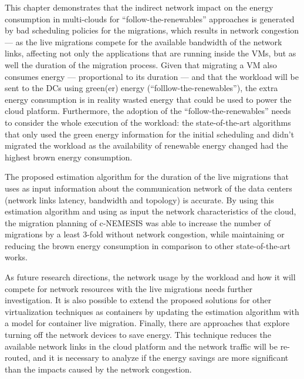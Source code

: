 This chapter demonstrates that the indirect network impact on the energy consumption in multi-clouds for ``follow-the-renewables'' approaches is generated by bad scheduling policies for the migrations, which results in network congestion --- as the live migrations compete for the available bandwidth of the network links, affecting not only the applications that are running inside the VMs, but as well the duration of the migration process. Given that migrating a VM also consumes energy --- proportional to its duration --- and that the workload will be sent to the DCs using green(er) energy (``folllow-the-renewables''), the extra energy consumption is in reality wasted energy that could be used to power the cloud platform. Furthermore, the adoption of the ``follow-the-renewables'' needs to consider the whole execution of the workload:  the state-of-the-art algorithms that only used the green energy information for the initial scheduling and didn't migrated the workload as the availability of renewable energy changed had the highest brown energy consumption. 

The proposed estimation algorithm for the duration of the live migrations that uses as input information about the communication network of the data centers (network links latency, bandwidth and topology) is accurate. By using this estimation algorithm and using as input the network characteristics of the cloud, the migration planning of c-NEMESIS was able to increase the number of migrations by a least 3-fold without network congestion, while maintaining or reducing the brown energy consumption in comparison to other state-of-the-art works.

As future research directions, the network usage by the workload and how it will compete for network resources with the live migrations needs further investigation. It is also possible to extend the proposed solutions for other virtualization techniques as containers by updating the estimation algorithm with a model for container live migration. Finally, there are approaches that explore turning off the network devices to save energy. This technique reduces the available network links in the cloud platform and the network traffic will be re-routed, and it is necessary to analyze if the energy savings are more significant than the impacts caused by the network congestion.
